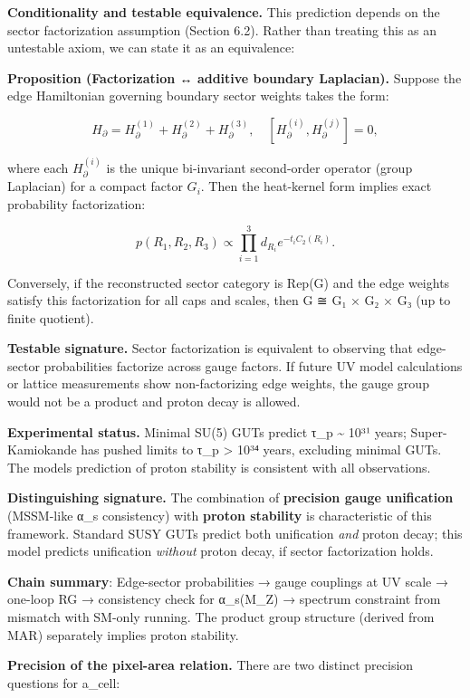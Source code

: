 \textbf{Conditionality and testable equivalence.} This prediction depends on the sector factorization assumption (Section 6.2). Rather than treating this as an untestable axiom, we can state it as an equivalence:

\textbf{Proposition (Factorization ↔ additive boundary Laplacian).} Suppose the edge Hamiltonian governing boundary sector weights takes the form:

\[
H_{\partial} = H^{(1)}_{\partial} + H^{(2)}_{\partial} + H^{(3)}_{\partial},
\quad [H^{(i)}_{\partial}, H^{(j)}_{\partial}] = 0,
\]

where each \(H^{(i)}_{\partial}\) is the unique bi-invariant second-order operator (group Laplacian) for a compact factor \(G_i\). Then the heat-kernel form implies exact probability factorization:

\[
p(R_1, R_2, R_3) \propto \prod_{i=1}^3 d_{R_i} e^{-t_i C_2(R_i)}.
\]

Conversely, if the reconstructed sector category is Rep(G) and the edge weights satisfy this factorization for all caps and scales, then G ≅ G₁ × G₂ × G₃ (up to finite quotient).

\textbf{Testable signature.} Sector factorization is equivalent to observing that edge-sector probabilities factorize across gauge factors. If future UV model calculations or lattice measurements show non-factorizing edge weights, the gauge group would not be a product and proton decay is allowed.

\textbf{Experimental status.} Minimal SU(5) GUTs predict τ\_p \textasciitilde{} 10³¹ years; Super-Kamiokande has pushed limits to τ\_p \textgreater{} 10³⁴ years, excluding minimal GUTs. The model\textquotesingle s prediction of proton stability is consistent with all observations.

\textbf{Distinguishing signature.} The combination of \textbf{precision gauge unification} (MSSM-like α\_s consistency) with \textbf{proton stability} is characteristic of this framework. Standard SUSY GUTs predict both unification \emph{and} proton decay; this model predicts unification \emph{without} proton decay, if sector factorization holds.

\textbf{Chain summary}: Edge-sector probabilities → gauge couplings at UV scale → one-loop RG → consistency check for α\_s(M\_Z) → spectrum constraint from mismatch with SM-only running. The product group structure (derived from MAR) separately implies proton stability.

\textbf{Precision of the pixel-area relation.} There are two distinct precision questions for a\_cell:

